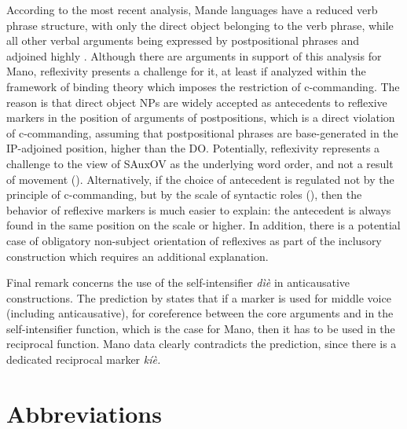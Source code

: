 \documentclass[output=paper]{langscibook}
\begin{document}
According to the most recent analysis, Mande languages have a reduced verb phrase structure, with only the direct object belonging to the verb phrase, while all other verbal arguments being expressed by postpositional phrases and adjoined highly \citep{Nikitina2018}. Although there are arguments in support of this analysis for Mano, reflexivity presents a challenge for it, at least if analyzed within the framework of binding theory which imposes the restriction of c-commanding. The reason is that direct object NPs are widely accepted as antecedents to reflexive markers in the position of arguments of postpositions, which is a direct violation of c-commanding, assuming that postpositional phrases are base-generated in the IP-adjoined position, higher than the DO. Potentially, reflexivity represents a challenge to the view of SAuxOV as the underlying word order, and not a result of movement (\citealt{SandeEtAl2019}). Alternatively, if the choice of antecedent is regulated not by the principle of c-commanding, but by the scale of syntactic roles (\citealt{TesteletsToldova1998}), then the behavior of reflexive markers is much easier to explain: the antecedent is always found in the same position on the scale or higher. In addition, there is a potential case of obligatory non-subject orientation of reflexives as part of the inclusory construction which requires an additional explanation.

Final remark concerns the use of the self-intensifier \textit{dìè} in anticausative constructions. The prediction by \citet{KoenigMoyseFaurie2016} states that if a marker is used for middle voice (including anticausative), for coreference between the core arguments and in the self-intensifier function, which is the case for Mano, then it has to be used in the reciprocal function. Mano data clearly contradicts the prediction, since there is a dedicated reciprocal marker \textit{kíè.}


 \section*{Abbreviations}
\end{document}
